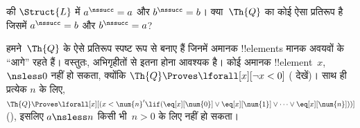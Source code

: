 \documentclass[../../../include/open-logic-section]{subfiles}
\begin{document}
\begin{prob}
 की $\Struct{L}$ में
$a^\nssucc
= a$ और $b^\nssucc = b$। क्या~$\Th{Q}$ का कोई ऐसा प्रतिरूप
है जिसमें $a^\nssucc = b$ और $b^\nssucc = a$?
\end{prob}

\begin{explain}
हमने~$\Th{Q}$ के ऐसे प्रतिरूप स्पष्ट रूप से बनाए हैं जिनमें अमानक
!!{element}s मानक अवयवों के “आगे” रहते हैं। वस्तुतः, अभिगृहीतों से इतना होना
आवश्यक है। कोई अमानक !!{element}~$x$, ${} \nsless 0$ नहीं हो सकता, क्योंकि
$\Th{Q} \Proves
\lforall[x][\lnot x<0]$
( देखें)। साथ ही प्रत्येक $n$ के लिए,
$\Th{Q} \Proves \lforall[x][(x < \num{n}' \lif
(\eq[x][\num{0}] \lor \eq[x][\num{1}] \lor \dots \lor
\eq[x][\num{n}]))]$ (), इसलिए
$a \nsless n$ किसी भी~$n>0$ के लिए नहीं हो सकता।
\end{explain}
\end{document}
